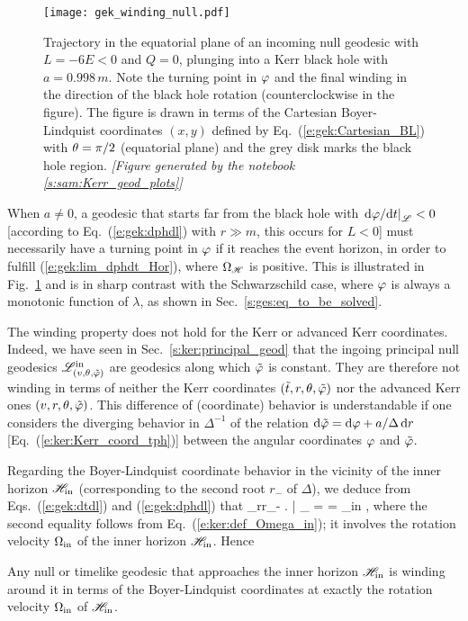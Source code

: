 \begin{figure}
\centerline{\texttt{[image: gek\_winding\_null.pdf]}}
\caption[]{\label{f:gek:winding_null} \footnotesize
Trajectory in the equatorial plane of an incoming null geodesic with
$L=-6E < 0$ and $Q=0$, plunging into a Kerr black hole with $a = 0.998 \, m$.
Note the turning point in $\varphi$ and the final winding in the direction of the black
hole rotation (counterclockwise in the figure). The figure is drawn in terms
of the Cartesian Boyer-Lindquist coordinates $(x,y)$ defined by
Eq.~(\ref{e:gek:Cartesian_BL}) with $\theta=\pi/2$ (equatorial plane)
and the grey disk marks the black hole region.
\textsl{[Figure generated by the notebook \ref{s:sam:Kerr_geod_plots}]}
}
\end{figure}


\begin{remark}
When $a\not=0$,
a geodesic that starts far from the black hole with
$\left. \mathrm{d}\varphi/\mathrm{d} t \right| _{\mathscr{L}} < 0$ [according to Eq.~(\ref{e:gek:dphdl}) with $r\gg m$,
this occurs for $L <0$]
must necessarily have a turning point in $\varphi$
if it reaches the event horizon, in order to fulfill (\ref{e:gek:lim_dphdt_Hor}),
where $\Omega_{\mathscr{H}}$ is positive. This is illustrated in Fig.~\ref{f:gek:winding_null}
and is in sharp contrast with the Schwarzschild case, where $\varphi$ is always
a monotonic function of $\lambda$, as shown in Sec.~\ref{s:ges:eq_to_be_solved}.
\end{remark}


\begin{remark}
The winding property does not hold for the Kerr or advanced Kerr coordinates. Indeed,
we have seen in Sec.~\ref{s:ker:principal_geod} that the
ingoing principal null geodesics $\mathscr{L}^{\rm in}_{(v,\theta,{\tilde\varphi})}$ are geodesics
along which ${\tilde\varphi}$ is constant. They are therefore not winding in terms
of neither the Kerr coordinates $({\tilde t},r,\theta,{\tilde\varphi})$ nor the advanced Kerr ones $(v,r,\theta,{\tilde\varphi})$.
This difference of (coordinate) behavior is understandable if one considers
the diverging behavior in $\Delta^{-1}$ of the
relation $\mathrm{d} {\tilde\varphi} = \mathrm{d} \varphi + a/\Delta\, \mathrm{d} r$ [Eq.~(\ref{e:ker:Kerr_coord_tph})]
between the angular coordinates $\varphi$ and ${\tilde\varphi}$.
\end{remark}

Regarding the Boyer-Lindquist coordinate behavior in the vicinity of the inner
horizon $\mathscr{H}_{\rm in}$ (corresponding to the second root $r_-$ of $\Delta$), we deduce
from
Eqs.~(\ref{e:gek:dtdl}) and
(\ref{e:gek:dphdl}) that
\be
    \lim_{r\to r_-} \left.  \right| _{\Li} =  = \Omega_{\rm in} ,
\ee
where the second equality follows from Eq.~(\ref{e:ker:def_Omega_in}); it involves
the rotation velocity $\Omega_{\rm in}$ of the inner horizon $\mathscr{H}_{\rm in}$.
Hence
\begin{prop}
Any null or timelike geodesic that approaches the inner horizon $\mathscr{H}_{\rm in}$
is winding around it in terms of the Boyer-Lindquist coordinates at exactly the
rotation velocity $\Omega_{\rm in}$ of $\mathscr{H}_{\rm in}$.
\end{prop}

